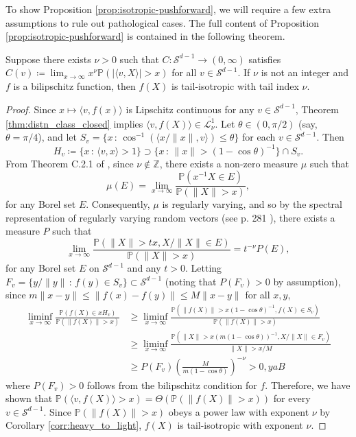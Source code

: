 \documentclass[thesis.tex]{subfiles}
\begin{document}
To show Proposition \ref{prop:isotropic-pushforward}, we will require a few extra assumptions to rule out pathological cases. The full content of Proposition \ref{prop:isotropic-pushforward} is contained in the following theorem.

\begin{theorem}
Suppose there exists $\nu > 0$ such that $C:\mathcal{S}^{d-1}\to(0,\infty)$ satisfies $C(v) \coloneqq \lim_{x \to \infty}x^{\nu}\mathbb{P}(|\langle v, X\rangle| > x)$ for all $v \in \mathcal{S}^{d-1}$. If $\nu$ is not an integer and $f$ is a bilipschitz function,
then $f(X)$ is tail-isotropic with tail index $\nu$. 
\end{theorem}
\begin{proof}
Since $x \mapsto \langle v, f(x)\rangle$ is Lipschitz continuous for any $v \in \mathcal{S}^{d-1}$, Theorem \ref{thm:distn_class_closed} implies $\langle v, f(X)\rangle \in \overline{\mathcal{L}_{\nu}^{1}}$. Let $\theta \in (0,\pi/2)$ (say, $\theta = \pi / 4$), and let $S_v = \{x\, : \, \cos^{-1}(\langle x/\|x\|, v\rangle)\leq\theta\}$ for each $v \in \mathcal{S}^{d-1}$. Then
\[
H_v \coloneqq \{x\,:\,\langle v, x \rangle > 1\} \supset \{x\,:\,\|x\| > (1-\cos\theta)^{-1}\} \cap S_v.
\]
From Theorem C.2.1 of \citet{buraczewski2016stochastic}, since $\nu \not \in \mathbb{Z}$, there exists a non-zero measure $\mu$ such that
\[
\mu(E) = \lim_{x \to \infty} \frac{\mathbb{P}(x^{-1}X \in E)}{\mathbb{P}(\|X\| > x)},
\]
for any Borel set $E$. Consequently, $\mu$ is regularly varying, and so 
by the spectral representation of regularly varying random vectors (see p. 281 \citet{buraczewski2016stochastic}), there exists a measure $P$ such that
\[
\lim_{x \to \infty}\frac{\mathbb{P}(\|X\|>tx, X/\|X\| \in E)}{\mathbb{P}(\|X\| > x)} = t^{-\nu} P(E),
\]
for any Borel set $E$ on $\mathcal{S}^{d-1}$ and any $t > 0$. Letting $F_v = \{y / \|y\|\,:\, f(y) \in S_v\} \subset \mathcal{S}^{d-1}$ (noting that $P(F_v) > 0$ by assumption), since $m\|x - y\| \leq \|f(x) - f(y)\| \leq M\|x - y\|$ for all $x,y$,
\begin{align*}
\liminf_{x \to \infty}
\frac{\mathbb{P}(f(X) \in x H_v)}{\mathbb{P}(\|f(X)\| > x)} 
&\geq \liminf_{x \to \infty}\frac{\mathbb{P}(\|f(X)\| > x(1-\cos\theta)^{-1}, f(X) \in S_v)}{\mathbb{P}(\|f(X)\| > x)} \\
&\geq \liminf_{x \to \infty}\frac{\mathbb{P}(\|X\| > x(m(1-\cos\theta))^{-1}, X/\|X\| \in F_v)}{\|X\| > x / M} \\
&\geq P(F_v) \left(\frac{M}{m(1-\cos\theta)}\right)^{-\nu} > 0,
yaB\end{align*}
where $P(F_v) > 0$ follows from the bilipschitz condition for $f$. Therefore, we have shown that $\mathbb{P}(\langle v, f(X)\rangle > x) = \Theta(\mathbb{P}(\|f(X)\| > x))$ for every $v \in \mathcal{S}^{d-1}$.
Since $\mathbb{P}(\|f(X)\| > x)$ obeys a power law with exponent $\nu$ by Corollary \ref{corr:heavy_to_light}, $f(X)$ is tail-isotropic with exponent $\nu$.
\end{proof}
\end{document}
